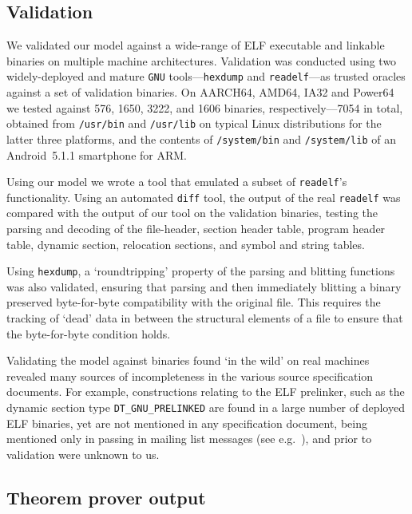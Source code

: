 \subsection{Validation}
\label{subsect.elf.validation}

We validated our model against a wide-range of ELF executable and linkable binaries on multiple machine architectures.
Validation was conducted using two widely-deployed and mature \texttt{GNU} tools---\texttt{hexdump} and \texttt{readelf}---as trusted oracles against a set of validation binaries.
On AARCH64, AMD64, IA32 and Power64 we tested against 576, 1650, 3222, and 1606 binaries, respectively---7054 in total, obtained from \texttt{/usr/bin} and \texttt{/usr/lib} on typical Linux distributions for the latter three platforms, and the contents of \texttt{/system/bin} and \texttt{/system/lib} of an Android~5.1.1 smartphone for ARM.

Using our model we wrote a tool that emulated a subset of \texttt{readelf}'s functionality.
Using an automated \texttt{diff} tool, the output of the real \texttt{readelf} was compared with the output of our tool on the validation binaries, testing the parsing and decoding of the file-header, section header table, program header table, dynamic section, relocation sections, and symbol and string tables.

Using \texttt{hexdump}, a `roundtripping' property of the parsing and blitting functions was also validated, ensuring that parsing and then immediately blitting a binary preserved byte-for-byte compatibility with the original file.
This requires the tracking of `dead' data in between the structural elements of a file to ensure that the byte-for-byte condition holds.

Validating the model against binaries found `in the wild' on real machines revealed many sources of incompleteness in the various source specification documents.
For example, constructions relating to the ELF prelinker, such as the dynamic section type \texttt{DT\_GNU\_PRELINKED} are found in a large number of deployed ELF binaries, yet are not mentioned in any specification document, being mentioned only in passing in mailing list messages (see e.g.~\cite{jelinek-prelinker-2001}), and prior to validation were unknown to us.

\subsection{Theorem prover output}
\label{subsect.theorem.prover.output}

